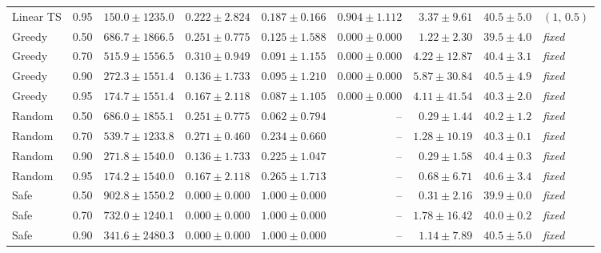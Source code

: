 {\begin{tabular}{llrrrrrrl}
Linear TS & 0.95 & $150.0\mathbin{\pm}1235.0$ & $0.222\mathbin{\pm}2.824$ & $0.187\mathbin{\pm}0.166$ & $0.904\mathbin{\pm}1.112$ & $3.37\mathbin{\pm}9.61$ & $40.5\mathbin{\pm}5.0$ & $(1,\,0.5)$ \\
\addlinespace[1pt]
Greedy & 0.50 & $686.7\mathbin{\pm}1866.5$ & $0.251\mathbin{\pm}0.775$ & $0.125\mathbin{\pm}1.588$ & $0.000\mathbin{\pm}0.000$ & $1.22\mathbin{\pm}2.30$ & $39.5\mathbin{\pm}4.0$ & \textit{fixed} \\
Greedy & 0.70 & $515.9\mathbin{\pm}1556.5$ & $0.310\mathbin{\pm}0.949$ & $0.091\mathbin{\pm}1.155$ & $0.000\mathbin{\pm}0.000$ & $4.22\mathbin{\pm}12.87$ & $40.4\mathbin{\pm}3.1$ & \textit{fixed} \\
Greedy & 0.90 & $272.3\mathbin{\pm}1551.4$ & $0.136\mathbin{\pm}1.733$ & $0.095\mathbin{\pm}1.210$ & $0.000\mathbin{\pm}0.000$ & $5.87\mathbin{\pm}30.84$ & $40.5\mathbin{\pm}4.9$ & \textit{fixed} \\
Greedy & 0.95 & $174.7\mathbin{\pm}1551.4$ & $0.167\mathbin{\pm}2.118$ & $0.087\mathbin{\pm}1.105$ & $0.000\mathbin{\pm}0.000$ & $4.11\mathbin{\pm}41.54$ & $40.3\mathbin{\pm}2.0$ & \textit{fixed} \\
\addlinespace[1pt]
Random & 0.50 & $686.0\mathbin{\pm}1855.1$ & $0.251\mathbin{\pm}0.775$ & $0.062\mathbin{\pm}0.794$ & -- & $0.29\mathbin{\pm}1.44$ & $40.2\mathbin{\pm}1.2$ & \textit{fixed} \\
Random & 0.70 & $539.7\mathbin{\pm}1233.8$ & $0.271\mathbin{\pm}0.460$ & $0.234\mathbin{\pm}0.660$ & -- & $1.28\mathbin{\pm}10.19$ & $40.3\mathbin{\pm}0.1$ & \textit{fixed} \\
Random & 0.90 & $271.8\mathbin{\pm}1540.0$ & $0.136\mathbin{\pm}1.733$ & $0.225\mathbin{\pm}1.047$ & -- & $0.29\mathbin{\pm}1.58$ & $40.4\mathbin{\pm}0.3$ & \textit{fixed} \\
Random & 0.95 & $174.2\mathbin{\pm}1540.0$ & $0.167\mathbin{\pm}2.118$ & $0.265\mathbin{\pm}1.713$ & -- & $0.68\mathbin{\pm}6.71$ & $40.6\mathbin{\pm}3.4$ & \textit{fixed} \\
\addlinespace[1pt]
Safe & 0.50 & $902.8\mathbin{\pm}1550.2$ & $0.000\mathbin{\pm}0.000$ & $1.000\mathbin{\pm}0.000$ & -- & $0.31\mathbin{\pm}2.16$ & $39.9\mathbin{\pm}0.0$ & \textit{fixed} \\
Safe & 0.70 & $732.0\mathbin{\pm}1240.1$ & $0.000\mathbin{\pm}0.000$ & $1.000\mathbin{\pm}0.000$ & -- & $1.78\mathbin{\pm}16.42$ & $40.0\mathbin{\pm}0.2$ & \textit{fixed} \\
Safe & 0.90 & $341.6\mathbin{\pm}2480.3$ & $0.000\mathbin{\pm}0.000$ & $1.000\mathbin{\pm}0.000$ & -- & $1.14\mathbin{\pm}7.89$ & $40.5\mathbin{\pm}5.0$ & \textit{fixed} \\

\end{tabular}}
